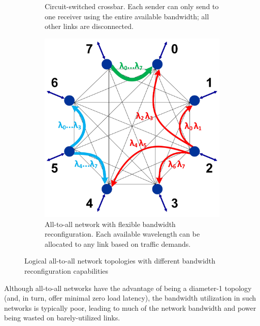 \begin{figure}[t!]
\begin{subfigure}[t]{0.31\linewidth}
        \caption{Circuit-switched crossbar. Each sender can only send to one receiver using the entire available bandwidth; all other links are disconnected.}
        		\label{fig:logtopmems}
    \end{subfigure}
        \hspace{0.1cm}
    \begin{subfigure}[t]{0.31\linewidth}
        \includegraphics[width=\textwidth, clip]{Figures/logtopflex.jpg}
        \caption{All-to-all network with flexible bandwidth reconfiguration. Each available wavelength can be allocated to any link based on traffic demands.}
        		\label{fig:logtopflex}
    \end{subfigure}
    \caption[]{Logical all-to-all network topologies with different bandwidth reconfiguration capabilities}
\end{figure}
Although all-to-all networks have the advantage of being a diameter-1 topology (and, in turn, offer minimal zero load latency), the bandwidth utilization in such networks is typically poor, leading to much of the network bandwidth and power being wasted on barely-utilized links. \\

